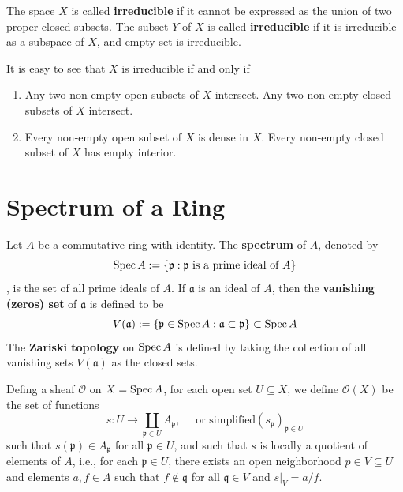\begin{definition}
    The space $X$ is called \textbf{irreducible} if it cannot be expressed as the union of two proper closed subsets.
    The subset $Y$ of $X$ is called \textbf{irreducible} if it is irreducible as a subspace of $X$, and empty set is irreducible.
    \begin{remark}
        It is easy to see that $X$ is irreducible if and only if
        \begin{enumerate}
            \item
                  Any two non-empty open subsets of $X$ intersect.
                  Any two non-empty closed subsets of $X$ intersect.
            \item
                  Every non-empty open subset of $X$ is dense in $X$.
                  Every non-empty closed subset of $X$ has empty interior.
        \end{enumerate}
    \end{remark}
\end{definition}


\section{Spectrum of a Ring}
\begin{definition}
    Let $A$ be a commutative ring with identity. The \textbf{spectrum} of $A$, denoted by
    \begin{equation*}
        \operatorname{Spec} A:=\left\{\mathfrak{p} : \mathfrak{p} \text{ is a prime ideal of } A\right\}
    \end{equation*}
    , is the set of all prime ideals of $A$.
    If $\mathfrak{a}$ is an ideal of $A$, then the \textbf{vanishing (zeros) set} of $\mathfrak{a}$ is defined to be
    \begin{equation*}
        V(\mathfrak{a}) := \left\{\mathfrak{p} \in \operatorname{Spec} A : \mathfrak{a} \subset \mathfrak{p}\right\}
        \subset
        \operatorname{Spec} A
    \end{equation*}
    The \textbf{Zariski topology} on $\operatorname{Spec} A$ is defined by taking the collection of all vanishing sets $V(\mathfrak{a})$ as the closed sets.
\end{definition}

\begin{definition}
    Defing a sheaf $\mathcal{O}$ on $X=\operatorname{Spec} A$, for each open set $U\subseteq X$, we define $\mathcal{O}(X)$ be the set of functions
    \begin{equation*}
        s:U\to \coprod_{\mathfrak{p}\in U} A_{\mathfrak{p}}, \quad \text{ or simplified} \left(s_\mathfrak{p}\right)_{\mathfrak{p}\in U}
    \end{equation*}
    such that $s(\mathfrak{p})\in A_{\mathfrak{p}}$ for all $\mathfrak{p}\in U$, and such that $s$ is locally a quotient of elements of $A$, i.e., for each $\mathfrak{p}\in U$, there exists an open neighborhood $p\in V\subseteq U$ and elements $a,f\in A$ such that $f\notin \mathfrak{q}$ for all $\mathfrak{q}\in V$ and $\left.s\right|_{V}=a/f$. 
\end{definition}


